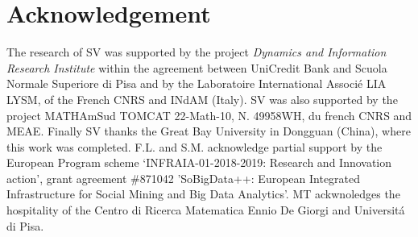 \documentclass{article}
\newcommand{\1}{\mathbbm{1}}
\begin{document}
             \section*{Acknowledgement}
             The research of SV was supported by the project {\em Dynamics and Information Research Institute} within the agreement between UniCredit Bank and Scuola Normale Superiore di Pisa and by the Laboratoire International Associ\'e LIA LYSM, of the French CNRS and  INdAM (Italy).  SV was also supported by the project MATHAmSud TOMCAT 22-Math-10, N. 49958WH, du french  CNRS and MEAE. Finally SV thanks the Great Bay University in Dongguan (China), where this work was completed.
              F.L. and S.M. acknowledge partial support by the European Program scheme ‘INFRAIA-01-2018-2019: Research and Innovation action’, grant agreement \#871042 ’SoBigData++: European Integrated Infrastructure for Social Mining and Big Data Analytics’. MT ackwnoledges the hospitality of the Centro di Ricerca Matematica Ennio De Giorgi and Universit\'a di Pisa. 
            
                
           
             


















 
\end{document}
